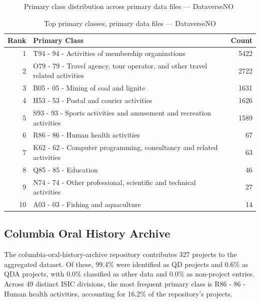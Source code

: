 \clearpage

\begin{figure}[H]
    \centering
    
    \caption{Primary class distribution across primary data files --- DataverseNO}
\end{figure}

\begin{table}[H]
    \centering
    \begin{tabular}{r p{10cm} r}
    \hline
    \textbf{Rank} & \textbf{Primary Class} & \textbf{Count} \\
    \hline
    1 & T94 - 94 - Activities of membership organizations & 5422 \\
    2 & O79 - 79 - Travel agency, tour operator, and other travel related activities & 2722 \\
    3 & B05 - 05 - Mining of coal and lignite & 1631 \\
    4 & H53 - 53 - Postal and courier activities & 1626 \\
    5 & S93 - 93 - Sports activities and amusement and recreation activities & 1589 \\
    6 & R86 - 86 - Human health activities & 67 \\
    7 & K62 - 62 - Computer programming, consultancy and related activities & 63 \\
    8 & Q85 - 85 - Education & 46 \\
    9 & N74 - 74 - Other professional, scientific and technical activities & 27 \\
    10 & A03 - 03 - Fishing and aquaculture & 14 \\
    \hline
    \end{tabular}
    \caption{Top primary classes, primary data files --- DataverseNO}
\end{table}

\clearpage

\subsection{Columbia Oral History Archive}


The columbia-oral-history-archive repository contributes 327 projects to the aggregated dataset. Of these, 99.4\% were identified as QD projects and 0.6\% as QDA projects, with 0.0\% classified as other data and 0.0\% as non-project entries. Across 49 distinct ISIC divisions, the most frequent primary class is R86 - 86 - Human health activities, accounting for 16.2\% of the repository's projects.


